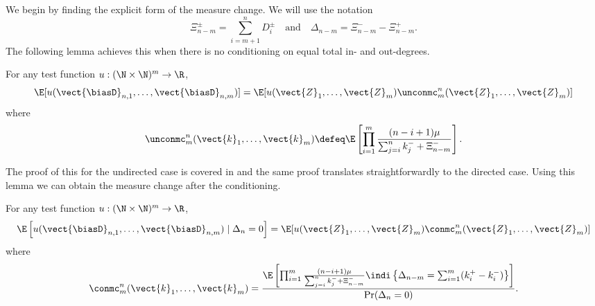 We begin by finding the explicit form of the measure change. We will use the notation
\begin{equation*}
    \Xi_{n-m}^{\pm} = \textstyle \sum_{i=m+1}^n D_i^{\pm}
    \quad \text{and} \quad
    \Delta_{n-m} = \Xi_{n-m}^- - \Xi_{n-m}^+.
\end{equation*}
The following lemma achieves this when there is no conditioning on equal total in- and out-degrees.
\begin{lemma}
    \label{lem:unconditioned-mc}
    For any test function $u: (\N \times \N)^m \to \R$, 
    \begin{equation*}
        \E[u(\vect{\biasD}_{n, 1}, \ldots, \vect{\biasD}_{n, m})] =
        \E[u(\vect{Z}_1, \ldots, \vect{Z}_m) \unconmc^n_m(\vect{Z}_1, \ldots, \vect{Z}_m)]
    \end{equation*}
    where
    \begin{equation*}
        \unconmc^n_m(\vect{k}_1, \ldots, \vect{k}_m) \defeq
        \E \left[ \prod_{i=1}^m \frac{(n - i + 1)\mu}{\sum_{j=i}^n k_j^- + \Xi^-_{n - m}}\right].
    \end{equation*}
\end{lemma}
The proof of this for the undirected case is covered in \cite[Proposition 4.2]{conchon--kerjanStableGraphMetric2020} and the same proof translates straightforwardly to the directed case. Using this lemma we can obtain the measure change after the conditioning.
\begin{lemma}
    \label{lem:measure-change-exact-conditioned}
    For any test function $u: (\N \times \N)^m \to \R$, 
    \begin{equation}
        \E\left[u(\vect{\biasD}_{n, 1}, \ldots, \vect{\biasD}_{n, m}) \mid \Delta_n = 0 \right] =
        \E[u(\vect{Z}_1, \ldots, \vect{Z}_m) \conmc^n_m(\vect{Z}_1, \ldots, \vect{Z}_m)]
        \label{eq:conditioned-measure-change-condition}
    \end{equation}
    where
    \begin{equation*}
        \conmc^n_m(\vect{k}_1, \ldots, \vect{k}_m) = \frac{
        \E \left[ \prod_{i=1}^m \frac{(n - i + 1)\mu}{\sum_{j=i}^n k_j^- + \Xi^-_{n - m}}
        \indi \left\{ \Delta_{n-m} = \sum_{i=1}^m (k^+_i - k^-_i) \right\}\right]
        }{\Pr(\Delta_n = 0)}.
    \end{equation*}
\end{lemma}

